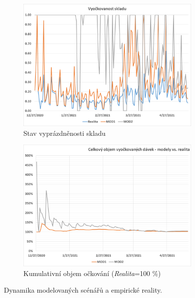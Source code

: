 \begin{figure}
\centering


\begin{subfigure}{0.9\textwidth}
\includegraphics[width=\textwidth]{assets/sklad_vyockovanost}
\caption{Stav vyprázdněnosti skladu}
\label{gr_mod_vyockovanost}
\end{subfigure}


\begin{subfigure}{0.9\textwidth}
\includegraphics[width=\textwidth]{assets/modely_vs_realita}
\caption{Kumulativní objem očkování (\emph{Realita}=100 \%)}
\label{gr_models_delta}
\end{subfigure}

\caption{Dynamika modelovaných scénářů a empirické reality.}
\label{gr_modelace}

\end{figure}

